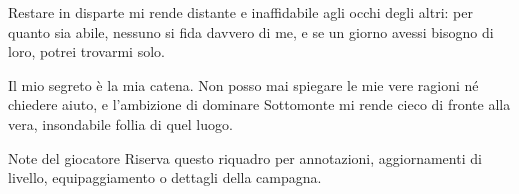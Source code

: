 \documentclass[letterpaper,twocolumn,openany,nodeprecatedcode,justified]{dndbook}
\begin{document}
Restare in disparte mi rende distante e inaffidabile agli occhi degli
altri: per quanto sia abile, nessuno si fida davvero di me, e se un giorno
avessi bisogno di loro, potrei trovarmi solo.

Il mio segreto è la mia catena. Non posso mai spiegare le mie vere ragioni
né chiedere aiuto, e l'ambizione di dominare Sottomonte mi rende cieco di
fronte alla vera, insondabile follia di quel luogo.

\begin{DndComment}{Note del giocatore}
Riserva questo riquadro per annotazioni, aggiornamenti di livello,
equipaggiamento o dettagli della campagna.
\end{DndComment}
\end{document}
